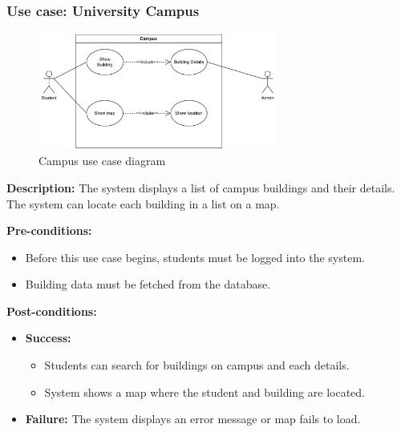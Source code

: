 \documentclass{article}
\begin{document}
\subsubsection{Use case: University Campus}
    \begin{figure}[H]
        \centering
        \includegraphics[width=0.7\textwidth]{image/CampusUseCase.pdf} 
        \caption{Campus use case diagram}
        \label{fig:campus_use_case}
    \end{figure}
    \textbf{Description:} The system displays a list of campus buildings and their details. The system can locate each building in a list on a map. \\

    \pagebreak

    \noindent \textbf{Pre-conditions:} 
        \begin{itemize}
            \item Before this use case begins, students must be logged into the system.
            \item Building data must be fetched from the database.
        \end{itemize}

    \noindent \textbf{Post-conditions:}
    \begin{itemize}
        \item \textbf{Success:} 
        \begin{itemize}
            \item Students can search for buildings on campus and each details.
            \item System shows a map where the student and building are located.
        \end{itemize}
        \item \textbf{Failure:} The system displays an error message or map fails to load.
    \end{itemize}
\end{document}

